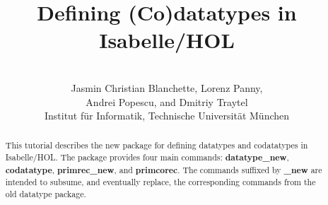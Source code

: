 \documentclass[12pt,a4paper]{article} %
\title{%
Defining (Co)datatypes in Isabelle/HOL}
\author{\hbox{} \\
Jasmin Christian Blanchette,
Lorenz Panny, \\
Andrei Popescu, and
Dmitriy Traytel \\
{\normalsize Institut f\"ur Informatik, Technische Universit\"at M\"unchen} \\
\hbox{}}
\newcommand{\keyw}[1]{\textbf{#1}}
\begin{document}
\maketitle

\begin{abstract}
\noindent
This tutorial describes the new package for defining datatypes and codatatypes
in Isabelle/HOL. The package provides four main commands:
\keyw{datatype\_new}, \keyw{codatatype}, \keyw{primrec\_new},
and \keyw{primcorec}. The commands suffixed by
\keyw{\_new} are intended to subsume, and eventually replace, the corresponding
commands from the old datatype package.
\end{abstract}

\tableofcontents



\let\em=\sl
{}

\end{document}
